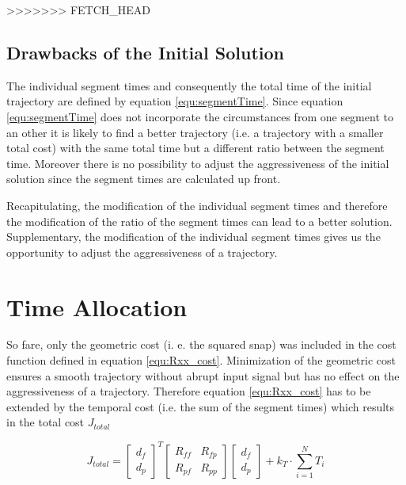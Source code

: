 >>>>>>> FETCH_HEAD
\subsection{Drawbacks of the Initial Solution}\label{sec:drawbackInitial}


The individual segment times and consequently the total time of the initial trajectory are defined by equation \ref{equ:segmentTime}. Since equation \ref{equ:segmentTime} does not incorporate the circumstances from one segment to an other it is likely to find a better trajectory (i.e. a trajectory with a smaller total cost) with the same total time but a different ratio between the segment time. Moreover there is no possibility to adjust the aggressiveness of the initial solution since the segment times are calculated up front. \newline

Recapitulating, the modification of the individual segment times and therefore the modification of the ratio of the segment times can lead to a better solution. Supplementary, the modification of the individual segment times gives us the opportunity to adjust the aggressiveness of a trajectory.



\section{Time Allocation}\label{sec:penalty}

So fare, only the geometric cost (i. e. the squared snap) was included in the cost function defined in equation \ref{equ:Rxx_cost}. Minimization of the geometric cost ensures a smooth trajectory without abrupt input signal but has no effect on the aggressiveness of a trajectory. Therefore equation \ref{equ:Rxx_cost} has to be extended by the temporal cost (i.e. the sum of the segment times) which results in the total cost $J_{total}$

\begin{equation}
J_{total} =
\begin{bmatrix}
   d_f \\
  d_p
\end{bmatrix}^T
\begin{bmatrix}
   R_{ff} & R_{fp} \\
  R_{pf} & R_{pp}
\end{bmatrix}
\begin{bmatrix}
   d_f \\
  d_p
\end{bmatrix}
+ k_T \cdot \sum_{i=1}^N T_i
\label{equ:total_cost}
\end{equation}

